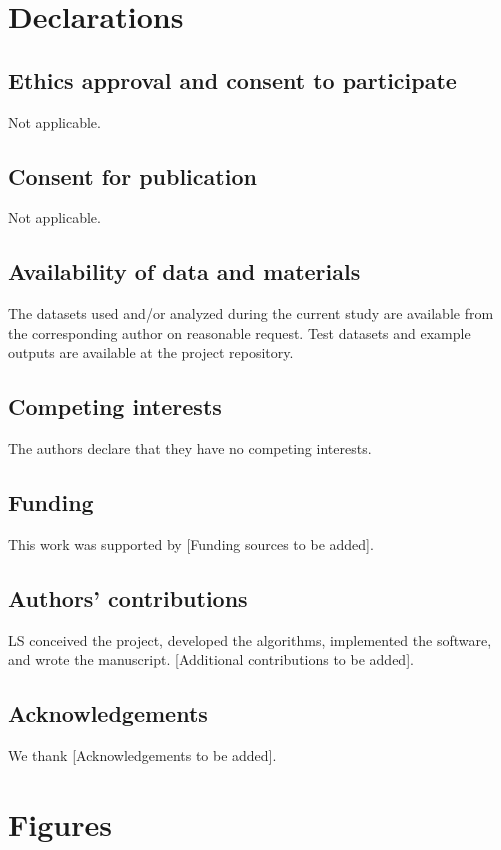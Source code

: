 \documentclass[12pt,a4paper]{article}
\begin{document}
\section{Declarations}

\subsection{Ethics approval and consent to participate}
Not applicable.

\subsection{Consent for publication}
Not applicable.

\subsection{Availability of data and materials}
The datasets used and/or analyzed during the current study are available from the corresponding author on reasonable request. Test datasets and example outputs are available at the project repository.

\subsection{Competing interests}
The authors declare that they have no competing interests.

\subsection{Funding}
This work was supported by [Funding sources to be added].

\subsection{Authors' contributions}
LS conceived the project, developed the algorithms, implemented the software, and wrote the manuscript. [Additional contributions to be added].

\subsection{Acknowledgements}
We thank [Acknowledgements to be added].




\clearpage

\section{Figures}
\end{document}
